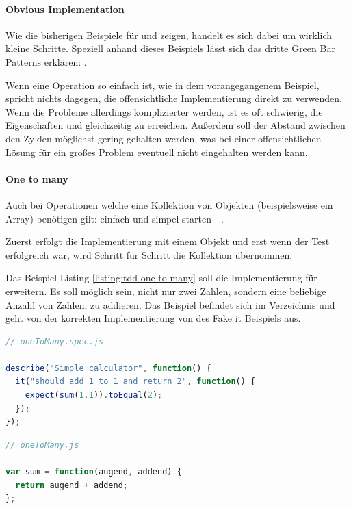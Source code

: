 \paragraph{Obvious Implementation}

Wie die bisherigen Beispiele für  und  zeigen, handelt es sich dabei um wirklich kleine Schritte. Speziell anhand dieses Beispiels lässt sich das dritte Green Bar Patterns erklären: .

Wenn eine Operation so einfach ist, wie in dem vorangegangenem Beispiel, spricht nichts dagegen, die offensichtliche Implementierung direkt zu verwenden.
Wenn die Probleme allerdings komplizierter werden, ist es oft schwierig, die Eigenschaften  und  gleichzeitig zu erreichen. Außerdem soll der Abstand zwischen den Zyklen möglichst gering gehalten werden, was bei einer offensichtlichen Lösung für ein großes Problem eventuell nicht eingehalten werden kann.

\paragraph{One to many}

Auch bei Operationen welche eine Kollektion von Objekten (beispielsweise ein Array) benötigen gilt: einfach und simpel starten -  \autocite[154]{Beck:2003}.

Zuerst erfolgt die Implementierung mit einem Objekt und erst wenn der Test erfolgreich war, wird Schritt für Schritt die Kollektion übernommen.

Das Beispiel Listing \ref{listing:tdd-one-to-many} soll die Implementierung für  erweitern. Es soll möglich sein, nicht nur zwei Zahlen, sondern eine beliebige Anzahl von Zahlen, zu addieren. Das Beispiel befindet sich im Verzeichnis  und geht von der korrekten Implementierung von  des Fake it Beispiels aus.

\begin{lstlisting}[language=JavaScript, caption=TDD - One to many, label=listing:tdd-one-to-many]
// oneToMany.spec.js

describe("Simple calculator", function() {
  it("should add 1 to 1 and return 2", function() {
    expect(sum(1,1)).toEqual(2);
  });
});
\end{lstlisting}
\newpage
\begin{lstlisting}[language=JavaScript, caption=TDD - One to many - Implementation]
// oneToMany.js

var sum = function(augend, addend) {
  return augend + addend;
};
\end{lstlisting}

